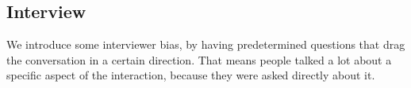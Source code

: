 \subsection{Interview}
We introduce some interviewer bias, by having predetermined questions that drag the conversation in a certain direction. That means people talked a lot about a specific aspect of the interaction, because they were asked directly about it.